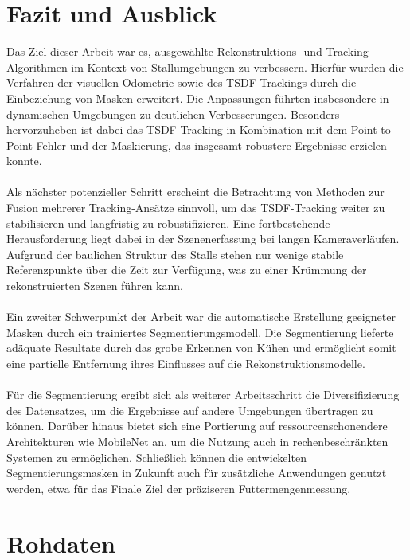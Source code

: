\documentclass[12pt,DIV=15,BCOR=15mm,twoside,headsepline,abstract=true,listof=totoc,bibliography=totoc]{scrreprt}
\theoremstyle{remark}    %
\begin{document}
    \chapter{Fazit und Ausblick}
    Das Ziel dieser Arbeit war es, ausgewählte Rekonstruktions- und Tracking-Algorithmen im Kontext von Stallumgebungen zu verbessern.
    Hierfür wurden die Verfahren der visuellen Odometrie sowie des \ac{TSDF}-Trackings durch die Einbeziehung von Masken erweitert.
    Die Anpassungen führten insbesondere in dynamischen Umgebungen zu deutlichen Verbesserungen. Besonders hervorzuheben ist dabei das 
    \ac{TSDF}-Tracking in Kombination mit dem Point-to-Point-Fehler und der Maskierung, das insgesamt robustere Ergebnisse erzielen konnte.\\\\
    Als nächster potenzieller Schritt erscheint die Betrachtung von Methoden zur Fusion mehrerer Tracking-Ansätze sinnvoll, um das \ac{TSDF}-Tracking 
    weiter zu stabilisieren und langfristig zu robustifizieren. Eine fortbestehende Herausforderung liegt dabei in der Szenenerfassung bei langen 
    Kameraverläufen. Aufgrund der baulichen Struktur des Stalls stehen nur wenige stabile Referenzpunkte über die Zeit zur Verfügung, was zu einer 
    Krümmung der rekonstruierten Szenen führen kann.\\\\
    Ein zweiter Schwerpunkt der Arbeit war die automatische Erstellung geeigneter Masken durch ein trainiertes Segmentierungsmodell. Die Segmentierung 
    lieferte adäquate Resultate durch das grobe Erkennen von Kühen und ermöglicht somit eine partielle Entfernung ihres Einflusses auf die 
    Rekonstruktionsmodelle. \\\\
    Für die Segmentierung ergibt sich als weiterer Arbeitsschritt die Diversifizierung des Datensatzes, um die Ergebnisse auf andere Umgebungen übertragen 
    zu können. Darüber hinaus bietet sich eine Portierung auf ressourcenschonendere Architekturen wie MobileNet an, um die Nutzung auch in 
    rechenbeschränkten Systemen zu ermöglichen.
    Schließlich können die entwickelten Segmentierungsmasken in Zukunft auch für zusätzliche Anwendungen genutzt werden, etwa für das Finale Ziel der 
    präziseren Futtermengenmessung.

    \clearpage
    \appendix

    \chapter{Rohdaten}
\end{document}
